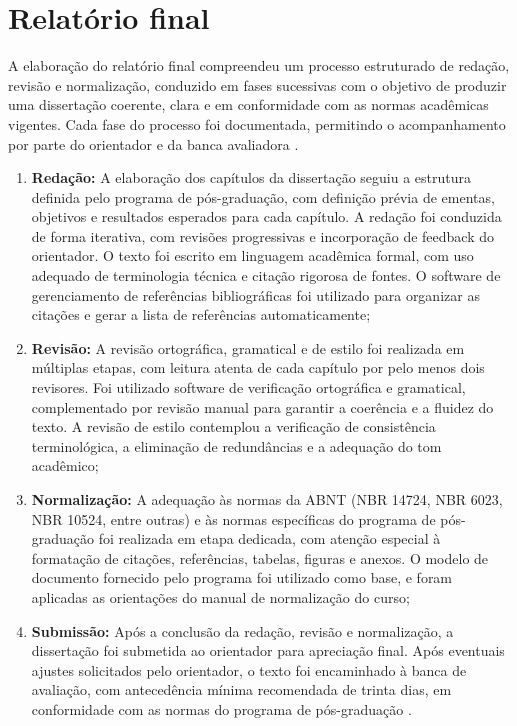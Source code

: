\section{Relatório final}
\label{sec:relatorio_final}

A elaboração do relatório final compreendeu um processo estruturado de redação, revisão e normalização, conduzido em fases sucessivas com o objetivo de produzir uma dissertação coerente, clara e em conformidade com as normas acadêmicas vigentes. Cada fase do processo foi documentada, permitindo o acompanhamento por parte do orientador e da banca avaliadora \cite{CRESWELL2018}.

\begin{enumerate}
    \item \textbf{Redação:} A elaboração dos capítulos da dissertação seguiu a estrutura definida pelo programa de pós-graduação, com definição prévia de ementas, objetivos e resultados esperados para cada capítulo. A redação foi conduzida de forma iterativa, com revisões progressivas e incorporação de feedback do orientador. O texto foi escrito em linguagem acadêmica formal, com uso adequado de terminologia técnica e citação rigorosa de fontes. O software de gerenciamento de referências bibliográficas foi utilizado para organizar as citações e gerar a lista de referências automaticamente;
    \item \textbf{Revisão:} A revisão ortográfica, gramatical e de estilo foi realizada em múltiplas etapas, com leitura atenta de cada capítulo por pelo menos dois revisores. Foi utilizado software de verificação ortográfica e gramatical, complementado por revisão manual para garantir a coerência e a fluidez do texto. A revisão de estilo contemplou a verificação de consistência terminológica, a eliminação de redundâncias e a adequação do tom acadêmico;
    \item \textbf{Normalização:} A adequação às normas da ABNT (NBR 14724, NBR 6023, NBR 10524, entre outras) e às normas específicas do programa de pós-graduação foi realizada em etapa dedicada, com atenção especial à formatação de citações, referências, tabelas, figuras e anexos. O modelo de documento fornecido pelo programa foi utilizado como base, e foram aplicadas as orientações do manual de normalização do curso;
    \item \textbf{Submissão:} Após a conclusão da redação, revisão e normalização, a dissertação foi submetida ao orientador para apreciação final. Após eventuais ajustes solicitados pelo orientador, o texto foi encaminhado à banca de avaliação, com antecedência mínima recomendada de trinta dias, em conformidade com as normas do programa de pós-graduação \cite{SANTOS2024}.
\end{enumerate}


